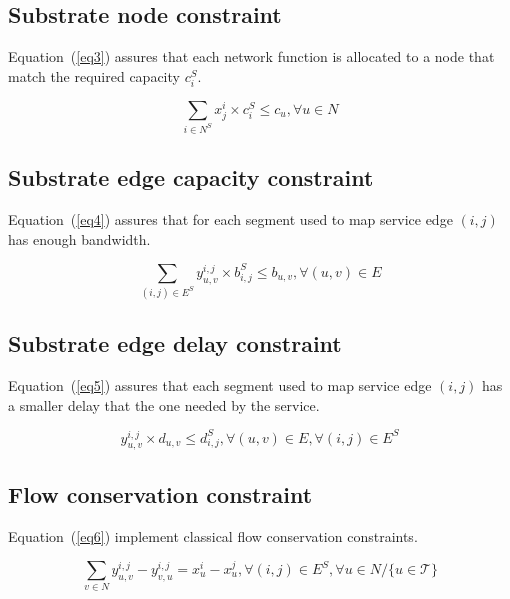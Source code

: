 \begin{appendices}
\subsection{Substrate node constraint}

Equation~(\ref{eq3}) assures that each network function is allocated to a node that match the required capacity $c^{S}_{i}$.

\begin{equation} \label{eq3}
	\sum_{i \in N^{S} } x_{j}^{i} \times c_{i}^{S} \leq c_{u}, \forall u \in N		
\end{equation}

\subsection{Substrate edge capacity constraint}

Equation~(\ref{eq4}) assures that for each segment used to map service edge $(i,j)$ has enough bandwidth.

\begin{equation}\label{eq4}
	\sum_{(i,j)\in E^{S}}{y_{u,v}^{i,j}\times b_{i,j}^{S}} \leq b_{u,v}, \forall (u,v) \in E
\end{equation}


\subsection{Substrate edge delay constraint}

Equation~(\ref{eq5}) assures that each segment used to map service edge $(i,j)$ has a smaller delay that the one needed by the service.

\begin{equation}\label{eq5}
	y_{u,v}^{i,j}\times d_{u,v} \leq d_{i,j}^{S}, \forall (u,v) \in E, \forall (i,j) \in E^{S}
\end{equation}

\subsection{Flow conservation constraint}

Equation~(\ref{eq6}) implement classical flow conservation constraints.


\begin{equation}\label{eq6}
\sum_{v \in N}{y_{u,v}^{i,j}-y_{v,u}^{i,j}} = x_{u}^{i}-x_{u}^{j}, \forall (i,j) \in E^{S}, \forall u \in N / \{u \in  \mathscr{T}\}
\end{equation}


\end{appendices}
